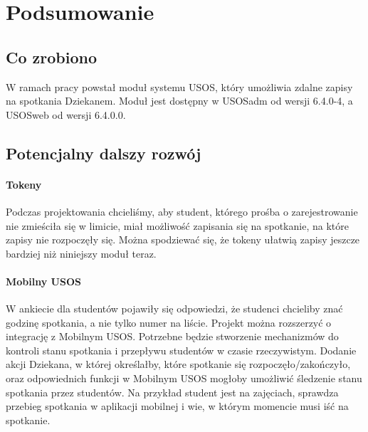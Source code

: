 \documentclass[licencjacka]{pracamgr}
\begin{document}


\chapter{Podsumowanie}  \label{chap:rozwoj}
\section{Co zrobiono}
W ramach pracy powstał moduł systemu USOS, który umożliwia zdalne zapisy na spotkania Dziekanem. Moduł jest dostępny w USOSadm od wersji 6.4.0-4, a USOSweb od wersji 6.4.0.0.

\section{Potencjalny dalszy rozwój}

\subsubsection{Tokeny}
Podczas projektowania chcieliśmy, aby student, którego prośba o zarejestrowanie nie zmieściła się w limicie, miał możliwość zapisania się na spotkanie, na które zapisy nie rozpoczęły się. Można spodziewać się, że tokeny ułatwią zapisy jeszcze bardziej niż niniejszy moduł teraz.

\subsubsection{Mobilny USOS}

W ankiecie dla studentów pojawiły się odpowiedzi, że studenci chcieliby znać godzinę spotkania, a nie tylko numer na liście. Projekt można rozszerzyć o integrację z Mobilnym USOS. Potrzebne będzie stworzenie mechanizmów do kontroli stanu spotkania i przepływu studentów w czasie rzeczywistym. Dodanie akcji Dziekana, w której określałby, które spotkanie się rozpoczęło/zakończyło, oraz odpowiednich funkcji w Mobilnym USOS mogłoby umożliwić śledzenie stanu spotkania przez studentów. Na przykład student jest na zajęciach, sprawdza przebieg spotkania w aplikacji mobilnej i wie, w którym momencie musi iść na spotkanie.
\end{document}
